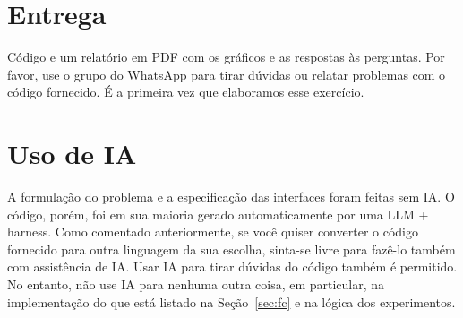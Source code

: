 \documentclass[11pt,a4paper]{article}
\begin{document}
\section{Entrega}

Código e um relatório em PDF com os gráficos e as respostas às perguntas. Por favor, use o grupo do
WhatsApp para tirar dúvidas ou relatar problemas com o código fornecido. É a primeira vez que
elaboramos esse exercício.

\section{Uso de IA}

A formulação do problema e a especificação das interfaces foram feitas sem IA. O código, porém, foi
em sua maioria gerado automaticamente por uma LLM + harness. Como comentado anteriormente, se você
quiser converter o código fornecido para outra linguagem da sua escolha, sinta-se livre para
fazê-lo também com assistência de IA. Usar IA para tirar dúvidas do código também é permitido. No
entanto, não use IA para nenhuma outra coisa, em particular, na implementação do que está listado na
Seção~\ref{sec:fc} e na lógica dos experimentos.
\end{document}
